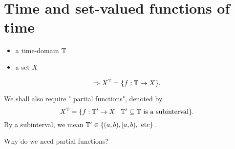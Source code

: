 
\section{Time and set-valued functions of time}

\begin{itemize}
	\item a time-domain $\mathbb{T}$ 
	\item a set $X$		
\end{itemize}
\[
\Rightarrow	X^{\mathbb{T}} = \{f : \mathbb{T} \to X\}
.\] 

We shall also require " partial functions", denoted by 
\[
	X^{\mathbb{T}} = \{f : \mathbb{T}' \to X  \mid \mathbb{T}' \subseteq \mathbb{T} \text{ is a  subinterval} \}
.\] 
By a subinterval, we mean $\mathbb{T}' \in  \{(a,b), [a,b), \text{ etc}\}$. 

Why do we need partial functions? 

